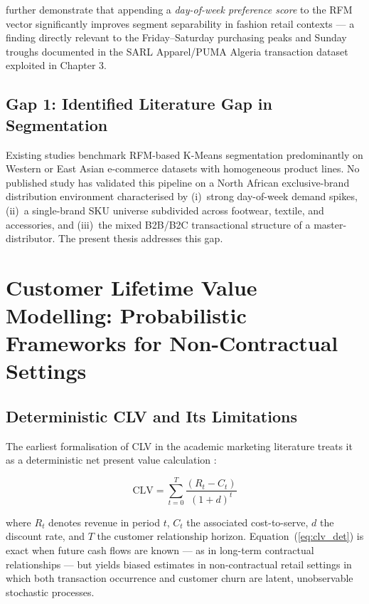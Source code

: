 \cite{sustainability2025} further demonstrate that appending a\textit{ day-of-week preference score} to the RFM vector significantly improves segment separability in fashion retail contexts — a finding directly relevant to the Friday--Saturday purchasing peaks and Sunday troughs documented in the SARL Apparel/PUMA Algeria transaction dataset exploited in Chapter 3.

\subsection{Gap 1: Identified Literature Gap in Segmentation}

\begin{tcolorbox}[colback=gray!10, colframe=black, title=\textbf{Literature Gap — Segmentation}, fonttitle=\bfseries]
Existing studies benchmark RFM-based K-Means segmentation predominantly on Western or East Asian e-commerce datasets with homogeneous product lines. No published study has validated this pipeline on a North African exclusive-brand distribution environment characterised by (i)~strong day-of-week demand spikes, (ii)~a single-brand SKU universe subdivided across footwear, textile, and accessories, and (iii)~the mixed B2B/B2C transactional structure of a master-distributor. The present thesis addresses this gap.
\end{tcolorbox}

\section{Customer Lifetime Value Modelling: Probabilistic Frameworks for Non-Contractual Settings}

\subsection{Deterministic CLV and Its Limitations}

The earliest formalisation of CLV in the academic marketing literature treats it as a deterministic net present value calculation \cite{Blattberg2001}:

\begin{equation}
    \text{CLV} = \sum_{t=0}^{T} \frac{(R_t - C_t)}{(1 + d)^t}
    \label{eq:clv_det}
\end{equation}

where $R_t$ denotes revenue in period $t$, $C_t$ the associated cost-to-serve, $d$ the discount rate, and $T$ the customer relationship horizon. Equation~(\ref{eq:clv_det}) is exact when future cash flows are known — as in long-term contractual relationships — but yields biased estimates in non-contractual retail settings in which both transaction occurrence and customer churn are latent, unobservable stochastic processes.

